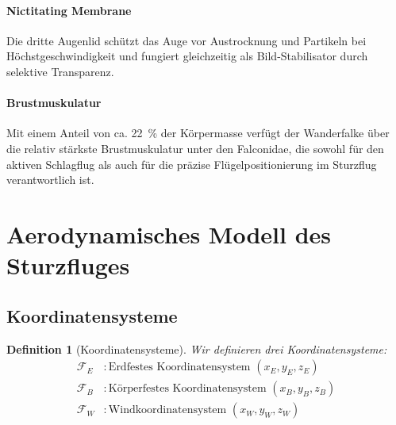 ﻿\documentclass[12pt,a4paper]{article}
\newtheorem{definition}{Definition}[section]
\theoremstyle{remark}
\begin{document}
	\paragraph{Nictitating Membrane} Die dritte Augenlid schützt das Auge vor Austrocknung und Partikeln bei Höchstgeschwindigkeit und fungiert gleichzeitig als Bild-Stabilisator durch selektive Transparenz.
	
	\paragraph{Brustmuskulatur} Mit einem Anteil von ca. \SI{22}{\percent} der Körpermasse verfügt der Wanderfalke über die relativ stärkste Brustmuskulatur unter den Falconidae, die sowohl für den aktiven Schlagflug als auch für die präzise Flügelpositionierung im Sturzflug verantwortlich ist.
	
	\section{Aerodynamisches Modell des Sturzfluges}
	\label{sec:aerodynamik}
	
	\subsection{Koordinatensysteme}
	
	\begin{definition}[Koordinatensysteme]
		Wir definieren drei Koordinatensysteme:
		\begin{align}
			\mathcal{F}_E &: \text{Erdfestes Koordinatensystem } (x_E, y_E, z_E) \\
			\mathcal{F}_B &: \text{Körperfestes Koordinatensystem } (x_B, y_B, z_B) \\
			\mathcal{F}_W &: \text{Windkoordinatensystem } (x_W, y_W, z_W)
		\end{align}
	\end{definition}
	
\end{document}
